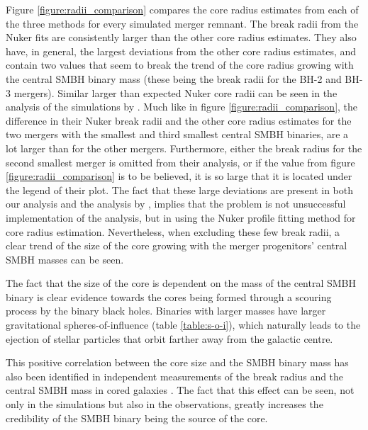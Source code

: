 \documentclass[english, oneside]{HYgradu}
\begin{document}
Figure \ref{figure:radii_comparison} compares the core radius estimates from each of the three methods for every simulated merger remnant. The break radii from the Nuker fits are consistently larger than the other core radius estimates. They also have, in general, the largest deviations from the other core radius estimates, and contain two values that seem to break the trend of the core radius growing with the central SMBH binary mass (these being the break radii for the BH-2 and BH-3 mergers). Similar larger than expected Nuker core radii can be seen in the analysis of the simulations by \cite{Rantala2018}. Much like in figure \ref{figure:radii_comparison}, the difference in their Nuker break radii and the other core radius estimates for the two mergers with the smallest and third smallest central SMBH binaries, are a lot larger than for the other mergers. Furthermore, either the break radius for the second smallest merger is omitted from their analysis, or if the value from figure \ref{figure:radii_comparison} is to be believed, it is so large that it is located under the legend of their plot. The fact that these large deviations are present in both our analysis and the analysis by \cite{Rantala2018}, implies that the problem is not unsuccessful implementation of the analysis, but in using the Nuker profile fitting method for core radius estimation. Nevertheless, when excluding these few break radii, a clear trend of the size of the core growing with the merger progenitors' central SMBH masses can be seen.

The fact that the size of the core is dependent on the mass of the central SMBH binary is clear evidence towards the cores being formed through a scouring process by the binary black holes. Binaries with larger masses have larger gravitational spheres-of-influence (table \ref{table:s-o-i}), which naturally leads to the ejection of stellar particles that orbit farther away from the galactic centre. 

This positive correlation between the core size and the SMBH binary mass has also been identified in independent measurements of the break radius and the central SMBH mass in cored galaxies \citep[e.g.][]{deRuiter2005, Lauer2007Cusp, Thomas2016}. The fact that this effect can be seen, not only in the simulations but also in the observations, greatly increases the credibility of the SMBH binary being the source of the core.
\end{document}
